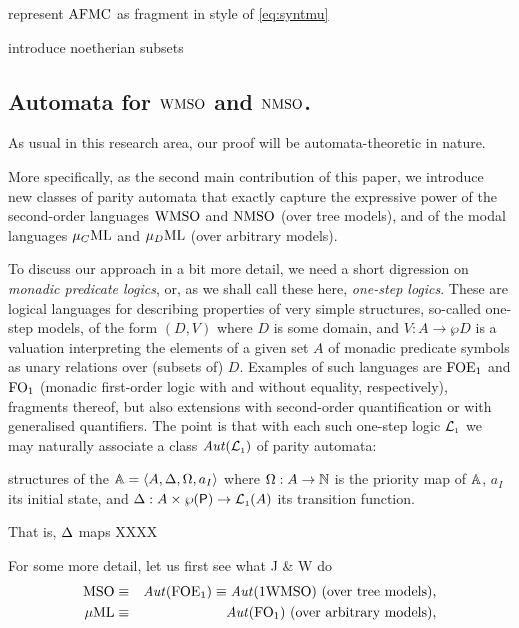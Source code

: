 \btbs
\item
represent $\mathrm{AFMC}$ as fragment in style of \eqref{eq:syntmu}
\item
introduce noetherian subsets
\etbs

\newpage

\subsection{Automata for $\mathrm{WMSO}$ and $\mathrm{NMSO}$.}

As usual in this research area, our proof will be automata-theoretic in
nature.
\btbs
\item
More specifically, as the second main contribution of this paper, we
introduce new classes of parity automata that exactly capture the expressive
power of the second-order languages $\mathrm{WMSO}$ and $\mathrm{NMSO}$ (over tree models), 
and of the modal languages $\mu_{C}\mathrm{ML}$ and $\mu_{D}\mathrm{ML}$ (over arbitrary models).
\etbs

To discuss our approach in a bit more detail, we need a short digression on 
\emph{monadic predicate logics}, or, as we shall call these here, \emph{one-step
logics}.
These are logical languages for describing properties of very simple structures,
so-called one-step models, of the form $(D,V)$ where $D$ is some domain, and 
$V: A \to \wp D$ is a valuation interpreting the elements of a given set $A$ 
of monadic predicate symbols as unary relations over (subsets of) $D$.
Examples of such languages are $\mathrm{FOE}_1$ and $\mathrm{FO}_1$ (monadic first-order logic
with and without equality, respectively), fragments thereof, but also extensions
with second-order quantification or with generalised quantifiers.
The point is that with each such one-step logic $\mathcal{L}_{\scriptscriptstyle 1}$ we may naturally 
associate a class $\mathit{Aut}(\mathcal{L}_{\scriptscriptstyle 1})$ of parity automata: 

\btbs
\item
structures of the  $\mathbb{A} = \langle{A,\Delta,\Omega,a_I}\rangle$ where 
$\Omega: A \to \mathbb{N}$ is the priority map of $\mathbb{A}$, $a_{I}$ its initial state,
and $\Delta: A \times \wp(\mathsf{P}) \to \mathcal{L}_{\scriptscriptstyle 1}(A)$ its transition function.
\item
That is, $\Delta$ maps  XXXX
\item
For some more detail, let us first see what J \& W do
\begin{eqnarray}
\mso & \equiv & \Aut(\ofoe) \equiv \Aut(1\wmso)
 \text{ (over tree models)},
\\ \muML & \equiv & \Aut(\ofo)
 \text{ (over arbitrary models)},
\end{eqnarray}

